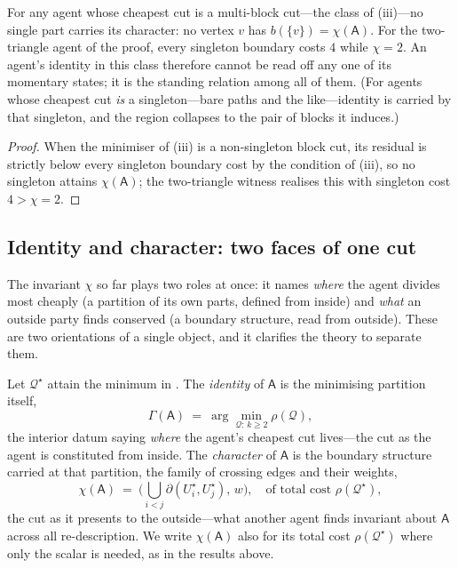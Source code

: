 \documentclass[11pt,twocolumn,a4paper]{article}
\newcommand{\Agent}{\mathsf{A}}
\newcommand{\Self}{\Gamma}          %
\newcommand{\wt}{w}
\newcommand{\cut}{\partial}
\newcommand{\Char}{\chi}             %
\begin{document}
\begin{corollary}
\label{cor:not-a-state}
For any agent whose cheapest cut is a multi-block cut---the class of
(iii)---no single part carries its character: no vertex
$v$ has $b(\{v\})=\Char(\Agent)$. For the two-triangle agent of the proof,
every singleton boundary costs $4$ while $\Char=2$. An agent's identity in
this class therefore cannot be read off any one of its momentary states; it
is the standing relation among all of them. (For agents whose cheapest cut
\emph{is} a singleton---bare paths and the like---identity is carried by
that singleton, and the region collapses to the pair of blocks it induces.)
\end{corollary}

\begin{proof}
When the minimiser of (iii) is a non-singleton block
cut, its residual is strictly below every singleton boundary cost by the
condition of (iii), so no singleton attains $\Char(\Agent)$; the
two-triangle witness realises this with singleton cost $4>\Char=2$.
\end{proof}

\subsection{Identity and character: two faces of one cut}
\label{sec:idchar}

The invariant $\Char$ so far plays two roles at once: it names \emph{where}
the agent divides most cheaply (a partition of its own parts, defined from
inside) and \emph{what} an outside party finds conserved (a boundary
structure, read from outside). These are two orientations of a single
object, and it clarifies the theory to separate them.

\begin{definition}
\label{def:idchar}
Let $\mathcal{Q}^\star$ attain the minimum in . The
\emph{identity} of $\Agent$ is the minimising partition itself,
\[
\Self(\Agent)\ =\ \arg\min_{\mathcal{Q}:\,k\ge2}\rho(\mathcal{Q}),
\]
the interior datum saying \emph{where} the agent's cheapest cut lives---the
cut as the agent is constituted from inside. The \emph{character} of
$\Agent$ is the boundary structure carried at that partition, the family of
crossing edges and their weights,
\[
\Char(\Agent)\ =\ \bigl(\textstyle\bigcup_{i<j}\cut(U^\star_i,U^\star_j),\,
\wt\bigr),\quad\text{of total cost }\rho(\mathcal{Q}^\star),
\]
the cut as it presents to the outside---what another agent finds invariant
about $\Agent$ across all re-description. We write $\Char(\Agent)$ also for
its total cost $\rho(\mathcal{Q}^\star)$ where only the scalar is needed,
as in the results above.
\end{definition}
\end{document}

